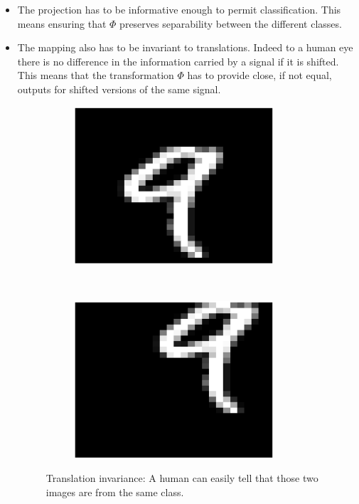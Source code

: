 \documentclass[a4paper,11pt]{report}
\begin{document}
			\begin{itemize}
				\item The projection has to be informative enough to permit classification. This means ensuring that $\Phi$ preserves separability between the different classes.\\

				\item The mapping also has to be invariant to translations. Indeed to a human eye there is no difference in the information carried by a signal if it is shifted. This means that the transformation $\Phi$ has to provide close, if not equal, outputs for shifted versions of the same signal.\\
		
				\begin{figure}[h]
					\centering
					\begin{subfigure}[t]{0.48\textwidth}
						\centering
						\includegraphics[height=2.3in]{im_nine_ori.eps}
					\end{subfigure}%
					~ 
					\begin{subfigure}[t]{0.48\textwidth}
						\centering
						\includegraphics[height=2.3in]{im_nine_trl.eps}
					\end{subfigure}
					\caption[Translation invariance.]{\centering Translation invariance: A human can easily tell that those two images are from the same class.}
					\label{fig:Illustration translation invariance}
				\end{figure}
	

\end{itemize}
\end{document}
